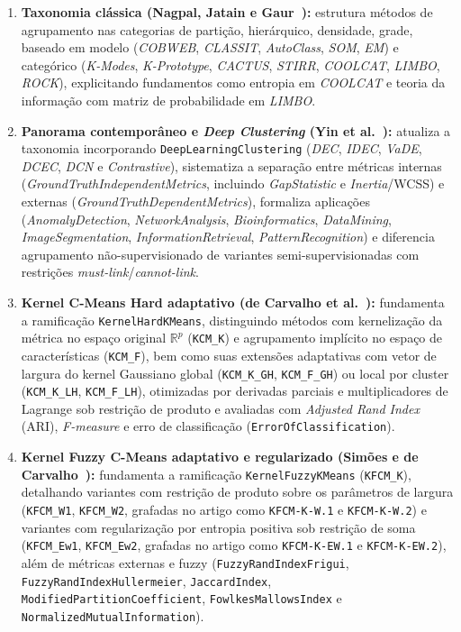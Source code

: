\documentclass[11pt,a4paper]{article}
\newcommand{\onto}[1]{\texttt{#1}}
\begin{document}
\begin{enumerate}[leftmargin=*,nosep]
  \item \textbf{Taxonomia clássica (Nagpal, Jatain e Gaur~\cite{nagpal2013review}):} estrutura métodos de agrupamento nas categorias de partição, hierárquico, densidade, grade, baseado em modelo (\emph{COBWEB}, \emph{CLASSIT}, \emph{AutoClass}, \emph{SOM}, \emph{EM}) e categórico (\emph{K-Modes}, \emph{K-Prototype}, \emph{CACTUS}, \emph{STIRR}, \emph{COOLCAT}, \emph{LIMBO}, \emph{ROCK}), explicitando fundamentos como entropia em \emph{COOLCAT} e teoria da informação com matriz de probabilidade em \emph{LIMBO}.
  \item \textbf{Panorama contemporâneo e \emph{Deep Clustering} (Yin et al.~\cite{yin2026rapid}):} atualiza a taxonomia incorporando \onto{DeepLearningClustering} (\emph{DEC}, \emph{IDEC}, \emph{VaDE}, \emph{DCEC}, \emph{DCN} e \emph{Contrastive}), sistematiza a separação entre métricas internas (\emph{GroundTruthIndependentMetrics}, incluindo \emph{GapStatistic} e \emph{Inertia}/WCSS) e externas (\emph{GroundTruthDependentMetrics}), formaliza aplicações (\emph{AnomalyDetection}, \emph{NetworkAnalysis}, \emph{Bioinformatics}, \emph{DataMining}, \emph{ImageSegmentation}, \emph{InformationRetrieval}, \emph{PatternRecognition}) e diferencia agrupamento não-supervisionado de variantes semi-supervisionadas com restrições \emph{must-link}/\emph{cannot-link}.
  \item \textbf{Kernel C-Means Hard adaptativo (de Carvalho et al.~\cite{decarvalho2018gaussian}):} fundamenta a ramificação \onto{KernelHardKMeans}, distinguindo métodos com kernelização da métrica no espaço original $\mathbb{R}^p$ (\onto{KCM\_K}) e agrupamento implícito no espaço de características (\onto{KCM\_F}), bem como suas extensões adaptativas com vetor de largura do kernel Gaussiano global (\onto{KCM\_K\_GH}, \onto{KCM\_F\_GH}) ou local por cluster (\onto{KCM\_K\_LH}, \onto{KCM\_F\_LH}), otimizadas por derivadas parciais e multiplicadores de Lagrange sob restrição de produto e avaliadas com \emph{Adjusted Rand Index} (ARI), \emph{F-measure} e erro de classificação (\onto{ErrorOfClassification}).
  \item \textbf{Kernel Fuzzy C-Means adaptativo e regularizado (Simões e de Carvalho~\cite{simoes2023gaussian}):} fundamenta a ramificação \onto{KernelFuzzyKMeans} (\onto{KFCM\_K}), detalhando variantes com restrição de produto sobre os parâmetros de largura (\onto{KFCM\_W1}, \onto{KFCM\_W2}, grafadas no artigo como \texttt{KFCM-K-W.1} e \texttt{KFCM-K-W.2}) e variantes com regularização por entropia positiva sob restrição de soma (\onto{KFCM\_Ew1}, \onto{KFCM\_Ew2}, grafadas no artigo como \texttt{KFCM-K-EW.1} e \onto{KFCM-K-EW.2}), além de métricas externas e fuzzy (\onto{FuzzyRandIndexFrigui}, \onto{FuzzyRandIndexHullermeier}, \onto{JaccardIndex}, \onto{ModifiedPartitionCoefficient}, \onto{FowlkesMallowsIndex} e \onto{NormalizedMutualInformation}).
\end{enumerate}
\end{document}
